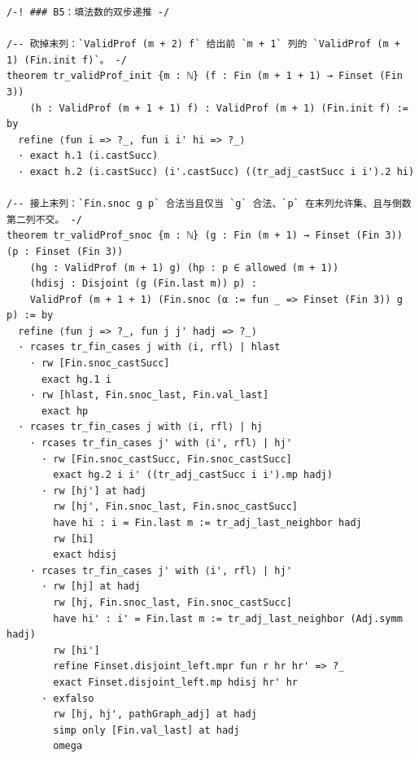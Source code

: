 \documentclass[11pt]{article}
\begin{document}
\begin{lstlisting}
/-! ### B5：填法数的双步递推 -/

/-- 砍掉末列：`ValidProf (m + 2) f` 给出前 `m + 1` 列的 `ValidProf (m + 1) (Fin.init f)`。 -/
theorem tr_validProf_init {m : ℕ} (f : Fin (m + 1 + 1) → Finset (Fin 3))
    (h : ValidProf (m + 1 + 1) f) : ValidProf (m + 1) (Fin.init f) := by
  refine ⟨fun i => ?_, fun i i' hi => ?_⟩
  · exact h.1 (i.castSucc)
  · exact h.2 (i.castSucc) (i'.castSucc) ((tr_adj_castSucc i i').2 hi)

/-- 接上末列：`Fin.snoc g p` 合法当且仅当 `g` 合法、`p` 在末列允许集、且与倒数第二列不交。 -/
theorem tr_validProf_snoc {m : ℕ} (g : Fin (m + 1) → Finset (Fin 3)) (p : Finset (Fin 3))
    (hg : ValidProf (m + 1) g) (hp : p ∈ allowed (m + 1))
    (hdisj : Disjoint (g (Fin.last m)) p) :
    ValidProf (m + 1 + 1) (Fin.snoc (α := fun _ => Finset (Fin 3)) g p) := by
  refine ⟨fun j => ?_, fun j j' hadj => ?_⟩
  · rcases tr_fin_cases j with ⟨i, rfl⟩ | hlast
    · rw [Fin.snoc_castSucc]
      exact hg.1 i
    · rw [hlast, Fin.snoc_last, Fin.val_last]
      exact hp
  · rcases tr_fin_cases j with ⟨i, rfl⟩ | hj
    · rcases tr_fin_cases j' with ⟨i', rfl⟩ | hj'
      · rw [Fin.snoc_castSucc, Fin.snoc_castSucc]
        exact hg.2 i i' ((tr_adj_castSucc i i').mp hadj)
      · rw [hj'] at hadj
        rw [hj', Fin.snoc_last, Fin.snoc_castSucc]
        have hi : i = Fin.last m := tr_adj_last_neighbor hadj
        rw [hi]
        exact hdisj
    · rcases tr_fin_cases j' with ⟨i', rfl⟩ | hj'
      · rw [hj] at hadj
        rw [hj, Fin.snoc_last, Fin.snoc_castSucc]
        have hi' : i' = Fin.last m := tr_adj_last_neighbor (Adj.symm hadj)
        rw [hi']
        refine Finset.disjoint_left.mpr fun r hr hr' => ?_
        exact Finset.disjoint_left.mp hdisj hr' hr
      · exfalso
        rw [hj, hj', pathGraph_adj] at hadj
        simp only [Fin.val_last] at hadj
        omega


\end{lstlisting}
\end{document}
